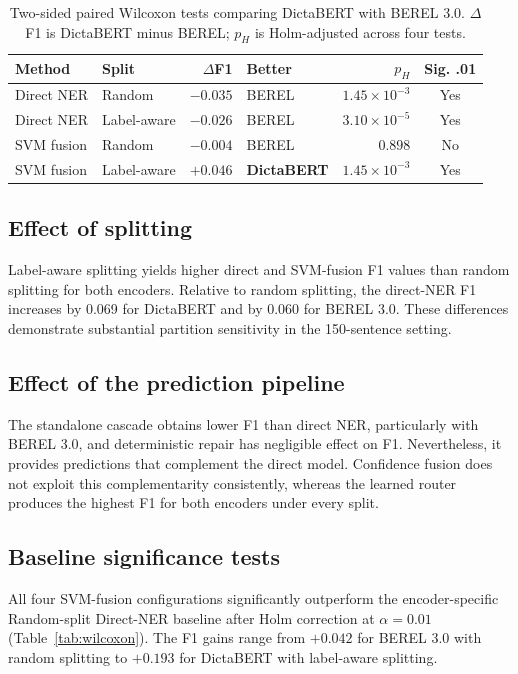 \documentclass[conference,a4paper]{IEEEtran}
\begin{document}
\begin{table}[!t]
\centering
\caption{Two-sided paired Wilcoxon tests comparing DictaBERT with BEREL 3.0. $\Delta$F1 is DictaBERT minus BEREL; $p_H$ is Holm-adjusted across four tests.}
\label{tab:encoder_wilcoxon}
\scriptsize
\begin{tabular}{@{}llrlrc@{}}
\toprule
Method & Split & $\Delta$F1 & Better & $p_H$ & Sig. .01 \\
\midrule
Direct NER & Random & $-0.035$ & BEREL & $1.45\!\times\!10^{-3}$ & Yes \\
Direct NER & Label-aware & $-0.026$ & BEREL & $3.10\!\times\!10^{-5}$ & Yes \\
SVM fusion & Random & $-0.004$ & BEREL & $0.898$ & No \\
SVM fusion & Label-aware & $\mathbf{+0.046}$ & \textbf{DictaBERT} & $1.45\!\times\!10^{-3}$ & Yes \\
\bottomrule
\end{tabular}
\end{table}

\subsection{Effect of splitting}

Label-aware splitting yields higher direct and SVM-fusion F1 values than random splitting for both encoders. Relative to random splitting, the direct-NER F1 increases by 0.069 for DictaBERT and by 0.060 for BEREL 3.0. These differences demonstrate substantial partition sensitivity in the 150-sentence setting.

\subsection{Effect of the prediction pipeline}

The standalone cascade obtains lower F1 than direct NER, particularly with BEREL 3.0, and deterministic repair has negligible effect on F1. Nevertheless, it provides predictions that complement the direct model. Confidence fusion does not exploit this complementarity consistently, whereas the learned router produces the highest F1 for both encoders under every split.

\subsection{Baseline significance tests}

All four SVM-fusion configurations significantly outperform the encoder-specific Random-split Direct-NER baseline after Holm correction at $\alpha=0.01$ (Table~\ref{tab:wilcoxon}). The F1 gains range from $+0.042$ for BEREL 3.0 with random splitting to $+0.193$ for DictaBERT with label-aware splitting.
\end{document}
